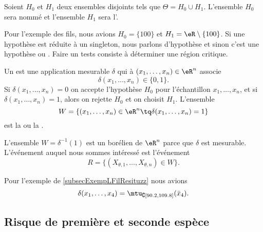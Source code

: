 Soient \( H_0\) et \( H_1\) deux ensembles disjoints tels que \( \Theta=H_0\cup H_1\). L'ensemble \( H_0\) sera nommé  et l'ensemble \( H_1\) sera l'. 

Pour l'exemple des fils, nous avions \( H_0=\{ 100 \}\) et \( H_1=\eR\setminus\{ 100 \}\). Si une hypothèse est réduite à un singleton, nous parlons d'hypothèse  et sinon c'est une hypothèse  ou . Faire un tests consiste à déterminer une région critique.

\begin{definition}
    Un  est une application mesurable \( \delta\) qui à \( (x_1,\ldots,x_n)\in\eR^n\) associe
    \begin{equation}
        \delta(x_1,\ldots,x_n)\in\{ 0,1 \}.
    \end{equation}
    Si \( \delta(x_1,\ldots,x_n)=0\) on accepte l'hypothèse \( H_0\) pour l'échantillon \( x_1,\ldots,x_n\), et si \( \delta(x_1,\ldots,x_n)=1\), alors on rejette \( H_0\) et on choisit \( H_1\). L'ensemble
    \begin{equation}
        W=\{ (x_1,\ldots,x_n)\in\eR^n\tq \delta(x_1,\ldots,x_n)=1 \}
    \end{equation}
    est la  ou la .
\end{definition}

L'ensemble \( W=\delta^{-1}(1)\) est un borélien de \( \eR^n\) parce que \( \delta\) est mesurable. L'événement auquel nous sommes intéressé est l'événement
\begin{equation}
    R=\{ (X_{\theta,1},\ldots,X_{\theta,n})\in W \}.
\end{equation}


\begin{example}
    Pour l'exemple de \ref{subsecExempLFilResituzz} nous avions
    \begin{equation}
        \delta(x_1,\ldots,x_4)=\mtu_{\complement\mathopen[ 90.2 , 109.8 \mathclose]}(\bar x_4).
    \end{equation}
\end{example}

\subsection{Risque de première et seconde espèce}

